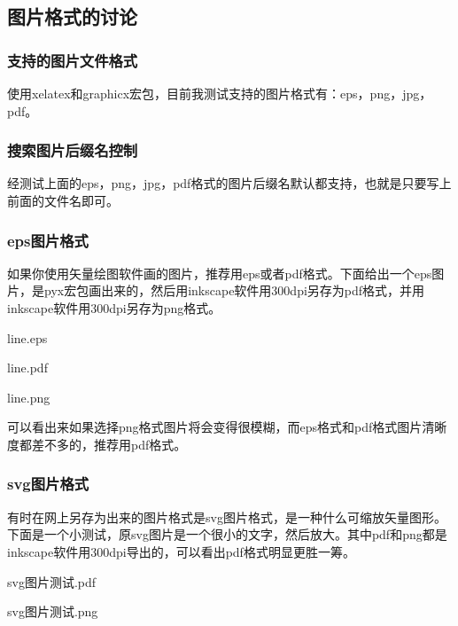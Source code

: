 \documentclass[12pt,oneside]{book}
\begin{document}
\begin{common-format}
\subsection{图片格式的讨论}
\subsubsection{支持的图片文件格式}
使用xelatex和graphicx宏包，目前我测试支持的图片格式有：eps，png，jpg，pdf。

\subsubsection{搜索图片后缀名控制}
经测试上面的eps，png，jpg，pdf格式的图片后缀名默认都支持，也就是只要写上前面的文件名即可。


\subsubsection{eps图片格式}
如果你使用矢量绘图软件画的图片，推荐用eps或者pdf格式。下面给出一个eps图片，是pyx宏包画出来的，然后用inkscape软件用300dpi另存为pdf格式，并用inkscape软件用300dpi另存为png格式。
\begin{linefig}{line.eps}
\label{fig:line.eps}
\caption{line.eps}
\end{linefig}
\begin{linefig}{line.pdf}
\label{fig:line.pdf}
\caption{line.pdf}
\end{linefig}
\begin{linefig}{line.png}
\label{fig:line.png}
\caption{line.png}
\end{linefig}
可以看出来如果选择png格式图片将会变得很模糊，而eps格式和pdf格式图片清晰度都差不多的，推荐用pdf格式。

\subsubsection{svg图片格式}
有时在网上另存为出来的图片格式是svg图片格式，是一种什么可缩放矢量图形。下面是一个小测试，原svg图片是一个很小的文字，然后放大。其中pdf和png都是inkscape软件用300dpi导出的，可以看出pdf格式明显更胜一筹。
\begin{multicols}{2}
\begin{linefig}{svg图片测试.pdf}
\label{fig:svg图片测试.pdf}
\caption*{\footnotesize svg转化成pdf格式in300dpi}
\end{linefig}
\begin{linefig}{svg图片测试.png}
\label{fig:svg图片测试.png}
\caption*{\footnotesize svg转化成png格式in300dpi}
\end{linefig}
\end{multicols}


\end{common-format}
\end{document}

